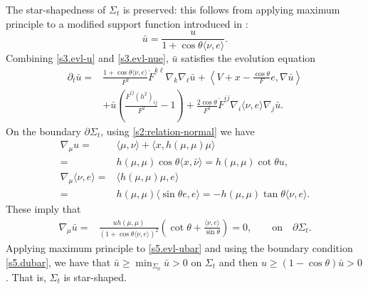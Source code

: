 \documentclass[11pt,reqno]{amsart}
\theoremstyle{definition}
\theoremstyle{remark}
\numberwithin{equation}{section}
\renewcommand{\(}{\left(}
\renewcommand{\)}{\right)}
\renewcommand{\-}{\overline}
\renewcommand{\t}{\theta}
\begin{document}
The star-shapedness of $\Sigma_t$ is preserved: this follows from applying maximum principle to a modified support function introduced in \cite[\S 2]{WWX23}:
\begin{equation*}
  \bar{u}=\frac{u}{1+\cos\theta\langle \nu,e\rangle}.
\end{equation*}
Combining \eqref{s3.evl-u} and \eqref{s3.evl-nue}, $\bar{u}$ satisfies the evolution equation
\begin{align}\label{s5.evl-ubar}
  \partial_t\bar{u}= & \frac{1+\cos\t\langle \nu,e\rangle}{F^2}\dot{F}^{k\ell}\nabla_k \nabla_\ell \bar{u} +\left\langle V+x-\frac{\cos\t}{F}e,\nabla \bar{u}\right\rangle\nonumber\\
  & +\bar{u}\left(\frac{\dot{F}^{ij}(h^2)_{ij}}{F^2}-1\right)+\frac{2\cos\theta}{F^2}\dot{F}^{ij}\nabla_i\langle\nu,e\rangle\nabla_j\bar{u}.
\end{align}
On the boundary $\partial\Sigma_t$, using \eqref{s2:relation-normal} we have
\begin{align*}
  \nabla_\mu u= & \langle \mu,\nu\rangle +\langle x, h(\mu,\mu)\mu\rangle  \\
  =& h(\mu,\mu) \cos\theta\langle x, \bar{\nu}\rangle =  h(\mu,\mu)\cot\theta u,\\
  \nabla_\mu\langle\nu,e\rangle=&\langle h(\mu,\mu)\mu,e\rangle \\
  =&h(\mu,\mu)\langle \sin\theta e,e\rangle=-h(\mu,\mu)\tan\theta\langle \nu,e\rangle.
\end{align*}
These imply that
\begin{align}\label{s5.dubar}
  \nabla_\mu\bar{u} =&  \frac{uh(\mu,\mu)}{(1+\cos\t\langle \nu,e\rangle)^2}\left(\cot\theta+\frac{\langle \nu,e\rangle}{\sin\theta}\right) =0,\qquad \text{on}\quad \partial\Sigma_t.
\end{align}
Applying maximum principle to \eqref{s5.evl-ubar} and using the boundary condition \eqref{s5.dubar}, we have that $\bar{u}\geq \min_{\Sigma_0}\bar{u}>0$ on $\Sigma_t$ and then $u\geq (1-\cos\theta)\bar{u}>0$. That is, $\Sigma_t$ is star-shaped.
\end{document}
